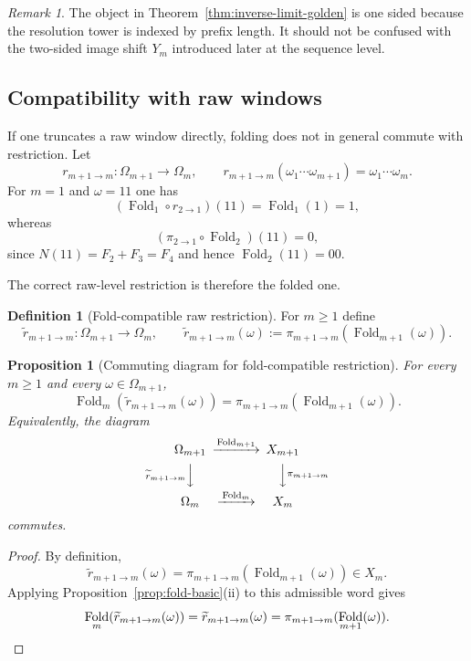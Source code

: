 \documentclass[11pt,letterpaper]{article}
\numberwithin{equation}{section}
\theoremstyle{plain}
\newtheorem{proposition}[theorem]{Proposition}
\theoremstyle{definition}
\newtheorem{definition}[theorem]{Definition}
\theoremstyle{remark}
\newtheorem{remark}[theorem]{Remark}
\DeclareMathOperator{\Fold}{Fold}
\begin{document}
\begin{remark}
The object in Theorem~\ref{thm:inverse-limit-golden} is one sided because the
resolution tower is indexed by prefix length.  It should not be confused with
the two-sided image shift $Y_m$ introduced later at the sequence level.
\end{remark}

\subsection{Compatibility with raw windows}

If one truncates a raw window directly, folding does not in general commute
with restriction.  Let
\[
r_{m+1\to m}:\Omega_{m+1}\to\Omega_m,
\qquad
r_{m+1\to m}(\omega_1\cdots\omega_{m+1})=\omega_1\cdots\omega_m.
\]
For $m=1$ and $\omega=11$ one has
\[
(\Fold_1\circ r_{2\to 1})(11)=\Fold_1(1)=1,
\]
whereas
\[
(\pi_{2\to 1}\circ \Fold_2)(11)=0,
\]
since $N(11)=F_2+F_3=F_4$ and hence $\Fold_2(11)=00$.

The correct raw-level restriction is therefore the folded one.

\begin{definition}[Fold-compatible raw restriction]
\label{def:fold-compatible-restriction}
For $m\ge 1$ define
\[
\widetilde r_{m+1\to m}:\Omega_{m+1}\to\Omega_m,
\qquad
\widetilde r_{m+1\to m}(\omega):=\pi_{m+1\to m}(\Fold_{m+1}(\omega)).
\]
\end{definition}

\begin{proposition}[Commuting diagram for fold-compatible restriction]
\label{prop:fold-omega-commute}
For every $m\ge 1$ and every $\omega\in\Omega_{m+1}$,
\[
\Fold_m(\widetilde r_{m+1\to m}(\omega))
=
\pi_{m+1\to m}(\Fold_{m+1}(\omega)).
\]
Equivalently, the diagram
\[
\begin{CD}
\Omega_{m+1} @>{\Fold_{m+1}}>> X_{m+1}\\
@V{\widetilde r_{m+1\to m}}VV @VV{\pi_{m+1\to m}}V\\
\Omega_m @>{\Fold_m}>> X_m
\end{CD}
\]
commutes.
\end{proposition}

\begin{proof}
By definition,
\[
\widetilde r_{m+1\to m}(\omega)=\pi_{m+1\to m}(\Fold_{m+1}(\omega))\in X_m.
\]
Applying Proposition~\ref{prop:fold-basic}(ii) to this admissible word gives
\[
\Fold_m(\widetilde r_{m+1\to m}(\omega))
=
\widetilde r_{m+1\to m}(\omega)
=
\pi_{m+1\to m}(\Fold_{m+1}(\omega)).
\qedhere
\]
\end{proof}
\end{document}
